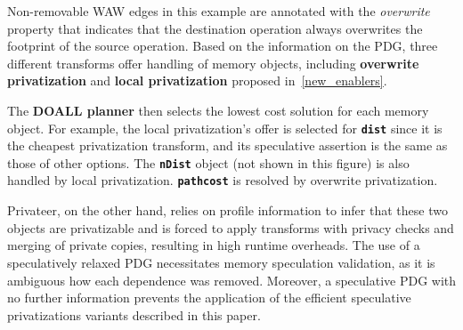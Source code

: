 Non-removable WAW edges in this example are annotated with
the \textit{overwrite} property that indicates that the destination
operation always overwrites the footprint of the source operation.
%
Based on the information on the PDG, three different transforms offer
handling of memory objects, including \textbf{overwrite privatization} and
\textbf{local privatization} proposed in~\cref{new_enablers}.

%
%
The \textbf{DOALL planner} then selects the lowest cost solution for each memory
object. For example, the local privatization's
offer is selected for \texttt{\textbf{dist}} since it is the cheapest
privatization transform, and its
speculative assertion is the same as those of other options.
The \texttt{\textbf{nDist}} object (not shown in this figure) is also handled
by local privatization. \texttt{\textbf{pathcost}} is resolved by overwrite
privatization.



%
Privateer, on the other hand, relies on profile information to infer
that these two objects are privatizable and is forced to apply
transforms with privacy checks and merging of private copies,
resulting in high runtime overheads. The use of a speculatively
relaxed PDG necessitates memory speculation validation, as it is
ambiguous how each dependence was removed.  Moreover, a speculative
PDG with no further information prevents the application of the
efficient speculative privatizations variants described in this paper.

%





